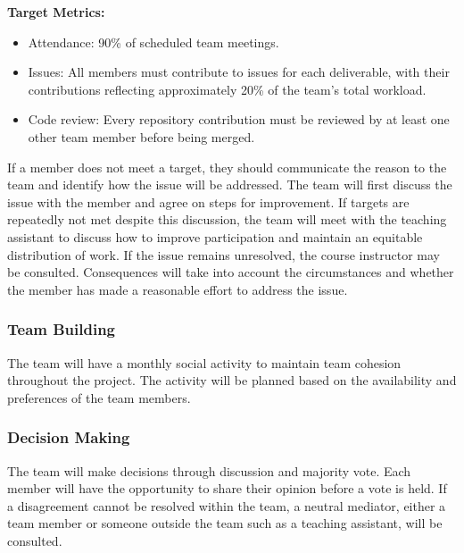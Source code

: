 \documentclass{article}
\begin{document}
\textbf{Target Metrics:}
\begin{itemize}
  \item Attendance: 90\% of scheduled team meetings.
  \item Issues: All members must contribute to issues for each deliverable, with
  their contributions reflecting approximately 20\% of the team's total workload.
  \item Code review: Every repository contribution must be reviewed by at least one other team member before being merged.
\end{itemize}

If a member does not meet a target, they should communicate the reason to the team and identify
how the issue will be addressed. The team will first discuss the issue with the member and agree
on steps for improvement. If targets are repeatedly not met despite this discussion, the team
will meet with the teaching assistant to discuss how to improve participation and maintain an
equitable distribution of work. If the issue remains unresolved, the course instructor may be
consulted. Consequences will take into account the circumstances and whether the member has made
a reasonable effort to address the issue.

\subsubsection*{Team Building}

The team will have a monthly social activity to maintain team cohesion throughout the project.
The activity will be planned based on the availability and preferences of the team members.

\subsubsection*{Decision Making}

The team will make decisions through discussion and majority vote. Each member will have the
opportunity to share their opinion before a vote is held. If a disagreement cannot be resolved
within the team, a neutral mediator, either a team member or someone outside the team such as
a teaching assistant, will be consulted.
\end{document}
